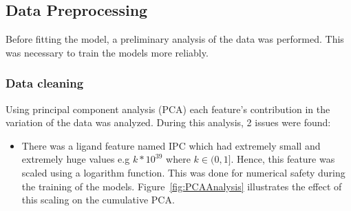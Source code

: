\documentclass[11pt]{article}
\begin{document}
\subsection{Data Preprocessing}
Before fitting the model,  a preliminary analysis of the data was performed.  This was necessary to train the models more reliably.

\subsubsection{Data cleaning}
Using principal component analysis (PCA) each feature's contribution in the variation of the data was analyzed. 
During this analysis, 2 issues were found:
\begin{itemize}
\item There was a ligand feature named IPC which had extremely small and extremely huge values e.g $k * 10^{39}$ where $k \in (0,1]$.
Hence, this feature was scaled using a logarithm function.
This was done for numerical safety during the training of the models.
Figure~\ref{fig:PCAAnalysis} illustrates the effect of this scaling on the cumulative PCA.


\end{itemize}
\end{document}
